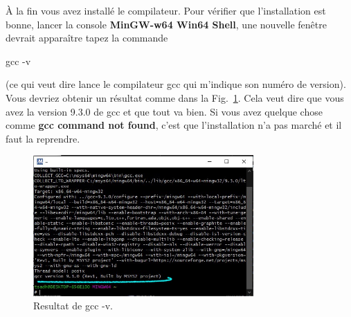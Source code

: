 \documentclass{article}
\newcommand\fig[1]{{Fig.~\ref{#1}}}
\begin{document}
À la fin vous avez installé le compilateur. Pour vérifier que l'installation est bonne, lancer la console {\color{MidnightBlue}\textbf{MinGW-w64 Win64 Shell}}, une nouvelle fenêtre devrait apparaître tapez la commande 
\begin{tcolorbox}[width=\textwidth,colframe=MidnightBlue,colback={black},title={Ceci est la console MinGW-w64 Win64 Shell},outer arc=0mm,colupper=white]    
      gcc -v
\end{tcolorbox}
(ce qui veut dire lance le compilateur gcc qui m'indique son numéro de version). Vous devriez obtenir un résultat comme dans la \fig{F:gccVersion}. Cela veut dire que vous avez la version 9.3.0 de gcc et que tout va bien. Si vous avez  quelque chose comme \textbf{gcc command not found}, c'est que l'installation n'a pas marché et il faut la reprendre.
\begin{figure}[H]
\center
\includegraphics[width=0.75\textwidth]{Plots/Msys2Con_13Gnu.jpg}
\caption{Resultat de gcc -v.\label{F:gccVersion}}
\end{figure}
\end{document}
